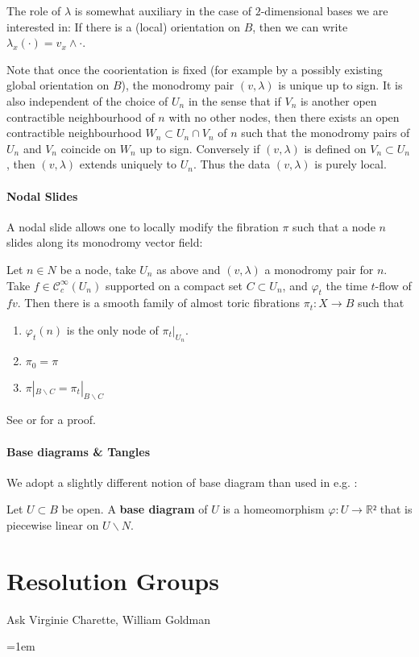 \documentclass[12pt,a4paper,abstract=true,draft]{scrartcl}
\begin{document}
The role of $λ$ is somewhat auxiliary in the case of $2$-dimensional bases we are interested in: If there is a (local) orientation on $B$, then we can write $λ_x(·) = v_x ∧ ·$.

Note that once the coorientation is fixed (for example by a possibly existing global orientation on $B$), the monodromy pair $(v,λ)$ is unique up to sign.
It is also independent of the choice of $U_n$ in the sense that if $V_n$ is another open contractible neighbourhood of $n$ with no other nodes, then there exists an open contractible neighbourhood $W_n ⊂ U_n ∩ V_n$ of $n$ such that the monodromy pairs of $U_n$ and $V_n$ coincide on $W_n$ up to sign.
Conversely if $(v,λ)$ is defined on $V_n ⊂ U_n$, then $(v,λ)$ extends uniquely to $U_n$.
Thus the data $(v,λ)$ is purely local.

\paragraph{Nodal Slides}
A nodal slide allows one to locally modify the fibration $π$ such that a node $n$ slides along its monodromy vector field:

\begin{lemma}
  \label{thm:nodal_slide}
  Let $n ∈ N$ be a node, take $U_n$ as above and $(v,λ)$ a monodromy pair for $n$.
  Take $f ∈ 𝒞^∞_c(U_n)$ supported on a compact set $C ⊂ U_n$, and $φ_t$ the time $t$-flow of $fv$.
  Then there is a smooth family of almost toric fibrations $π_t \colon X → B$ such that
  \begin{enumerate}
    \item $φ_t(n)$ is the only node of $π_t|_{U_n}$.
    \item $π_0 = π$
    \item $π|_{B ∖ C} = π_t|_{B ∖ C}$
  \end{enumerate}
\end{lemma}

See \cite[Theorem 6.5]{symington2002FourDF} or \cite[Theorem 8.10]{evans2021atfs} for a proof.

\paragraph{Base diagrams \& Tangles}
We adopt a slightly different notion of base diagram than used in e.g. \cite{symington2002FourDF,evans2021atfs}:

\begin{definition}
  Let $U ⊂ B$ be open. A \textbf{base diagram} of $U$ is a homeomorphism $φ \colon U → ℝ²$ that is piecewise linear on $U ∖ N$.
\end{definition}

\section{Resolution Groups}

Ask Virginie Charette, William Goldman

\emergencystretch=1em
\printbibliography
\end{document}
